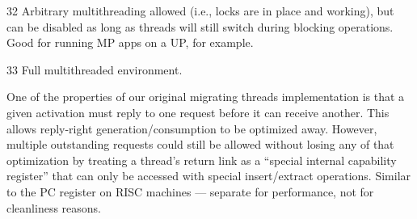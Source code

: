 {32      Arbitrary multithreading allowed
        (i.e., locks are in place and working),
        but can be disabled as long as threads will still switch
        during blocking operations.
        Good for running MP apps on a UP, for example.

33      Full multithreaded environment.





One of the properties of our original migrating threads implementation is that
a given activation must reply to one request before it can receive another.
This allows reply-right generation/consumption to be optimized away.  However,
multiple outstanding requests could still be allowed without losing any of that
optimization by treating a thread's return link as a ``special internal
capability register'' that can only be accessed with special insert/extract
operations.  Similar to the PC register on RISC machines --- separate for
performance, not for cleanliness reasons.
}



